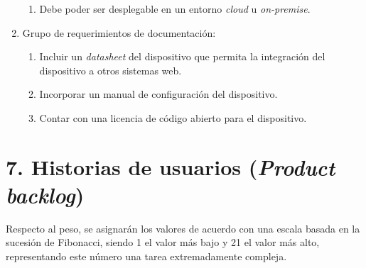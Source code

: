 \documentclass[
11pt, %
]{charter}
\begin{document}
\begin{enumerate}
\begin{enumerate}
	\item Debe poder ser desplegable en un entorno \textit{cloud} u \textit{on-premise}.
	\end{enumerate}
\item Grupo de requerimientos de documentación:
	\begin{enumerate}
	\item Incluir un \textit{datasheet} del dispositivo que permita la integración del dispositivo a otros sistemas web.
	\item Incorporar un manual de configuración del dispositivo.
	\item Contar con una licencia de código abierto para el dispositivo.
	\end{enumerate}
\end{enumerate}

\section{7. Historias de usuarios (\textit{Product backlog})}
\label{sec:backlog}

Respecto al peso, se asignarán los valores de acuerdo con una escala basada en la sucesión de Fibonacci, siendo 1 el valor más bajo y 21 el valor más alto, representando este número una tarea extremadamente compleja.
\end{document}

